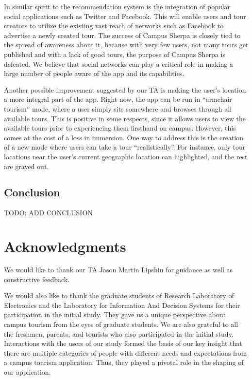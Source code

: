 \documentclass{sigchi}
\begin{document}
In similar spirit to the recommendation system is the integration of popular social applications such as Twitter and Facebook. This will enable users and tour creators to utilize the existing vast reach of networks such as Facebook to advertise a newly created tour. The success of Campus Sherpa is closely tied to the spread of awareness about it, because with very few users, not many tours get published and with a lack of good tours, the purpose of Campus Sherpa is defeated. We believe that social networks can play a critical role in making a large number of people aware of the app and its capabilities. 

Another possible improvement suggested by our TA is making the user's location a more integral part of the app. Right now, the app can be run in ``armchair tourism'' mode, where a user simply sits somewhere and browses through all available tours. This is positive in some respects, since it allows users to view the available tours prior to experiencing them firsthand on campus. However, this comes at the cost of a loss in immersion. One way to address this is the creation of a new mode where users can take a tour ``realistically''. For instance, only tour locations near the user's current geographic location can highlighted, and the rest are grayed out. 

\subsection{Conclusion}

TODO: ADD CONCLUSION

\section{Acknowledgments}

We would like to thank our TA Jason Martin Lipshin for guidance as well as constructive feedback. 

We would also like to thank the graduate students of Research Laboratory of Electronics and the Laboratory for Information And Decision Systems for their participation in the initial study. They gave us a unique perspective about campus tourism from the eyes of graduate students. We are also grateful to all the freshmen, parents, and tourists who also participated in the initial study. Interactions with the users of our study formed the basis of our key insight that there are multiple categories of people with different needs and expectations from a campus tourism application. Thus, they played a pivotal role in the shaping of our application. 
\end{document}
